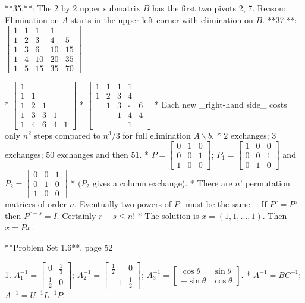 **35.**: The 2 by 2 upper submatrix \(B\) has the first two pivots 2, 7. Reason: Elimination on \(A\) starts in the upper left corner with elimination on \(B\).
**37.**: \(\begin{bmatrix}1&1&1&1\\ 1&2&3&4&5\\ 1&3&6&10&15\\ 1&4&10&20&35\\ 1&5&15&35&70\end{bmatrix}\)

* \(\begin{bmatrix}1&\\ 1&1\\ 1&2&1\\ 1&3&3&1\\ 1&4&6&4&1\end{bmatrix}\)
* \(\begin{bmatrix}1&1&1&1\\ 1&2&3&4\\ &1&3&\cdot&6\\ &&1&4&4\\ &&&1\end{bmatrix}\)
* Each new _right-hand side_ costs only \(n^{2}\) steps compared to \(n^{3}/3\) for full elimination \(A\backslash b\).
* \(2\) exchanges; \(3\) exchanges; \(50\) exchanges and then \(51\).
* \(P=\begin{bmatrix}0&1&0\\ 0&0&1\\ 1&0&0\end{bmatrix}\); \(P_{1}=\begin{bmatrix}1&0&0\\ 0&0&1\\ 0&1&0\end{bmatrix}\) and \(P_{2}=\begin{bmatrix}0&0&1\\ 0&1&0\\ 1&0&0\end{bmatrix}\)
* \((P_{2}\) gives a column exchange).
* There are \(n!\) permutation matrices of order \(n\). Eventually two powers of \(P\)_must be the same_: If \(P^{r}=P^{s}\) then \(P^{r-s}=I\). Certainly \(r-s\leq n!\)
* The solution is \(x=(1,1,\ldots,1)\). Then \(x=Px\).

**Problem Set 1.6**, page 52

1. \(A_{1}^{-1}=\begin{bmatrix}0&\frac{1}{3}\\ \frac{1}{2}&0\end{bmatrix}\); \(A_{2}^{-1}=\begin{bmatrix}\frac{1}{2}&0\\ -1&\frac{1}{2}\end{bmatrix}\); \(A_{3}^{-1}=\begin{bmatrix}\cos\theta&\sin\theta\\ -\sin\theta&\cos\theta\end{bmatrix}\).
* \(A^{-1}=BC^{-1}\); \(A^{-1}=U^{-1}L^{-1}P\).

